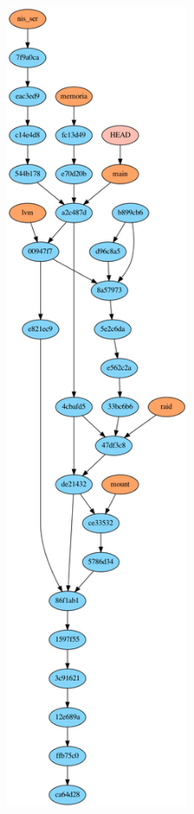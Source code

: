 \begin{multicols}{2}
    \includegraphics[trim={0 0 0 30cm}, clip, width=0.4\textwidth]{includes/graph.png}
\end{multicols}